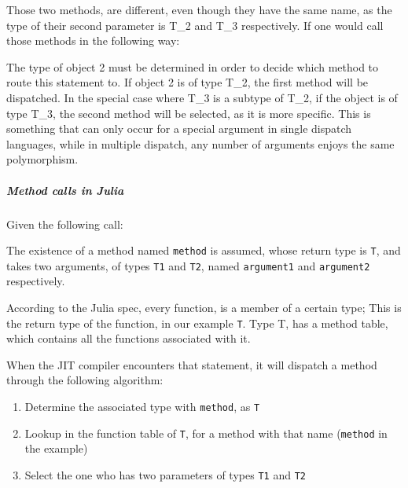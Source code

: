 \documentclass[11pt,a4paper,english,greek,twoside]{thesis}
\begin{document}
\begin{Shaded}
\begin{Highlighting}[]
\end{Highlighting}
\end{Shaded}

Those two methods, are different, even though they have the same name,
as the type of their second parameter is T\_2 and T\_3 respectively. If
one would call those methods in the following way:

\begin{Shaded}
\begin{Highlighting}[]
\end{Highlighting}
\end{Shaded}

The type of object 2 must be determined in order to decide which method
to route this statement to. If object 2 is of type T\_2, the first
method will be dispatched. In the special case where T\_3 is a subtype
of T\_2, if the object is of type T\_3, the second method will be
selected, as it is more specific. This is something that can only occur
for a special argument in single dispatch languages, while in multiple
dispatch, any number of arguments enjoys the same polymorphism.

\subparagraph{Method calls in Julia}\label{method-calls-in-julia}

Given the following call:

\begin{Shaded}
\begin{Highlighting}[]
\end{Highlighting}
\end{Shaded}

The existence of a method named \texttt{method} is assumed, whose return
type is \texttt{T}, and takes two arguments, of types \texttt{T1} and
\texttt{T2}, named \texttt{argument1} and \texttt{argument2}
respectively.

According to the Julia spec, every function, is a member of a certain
type; This is the return type of the function, in our example
\texttt{T}. Type T, has a method table, which contains all the functions
associated with it.

When the JIT compiler encounters that statement, it will dispatch a
method through the following algorithm:

\begin{enumerate}
\def\labelenumi{\arabic{enumi}.}
\tightlist
\item
  Determine the associated type with \texttt{method}, as \texttt{T}
\item
  Lookup in the function table of \texttt{T}, for a method with that
  name (\texttt{method} in the example)
\item
  Select the one who has two parameters of types \texttt{T1} and
  \texttt{T2}
\end{enumerate}
\end{document}
